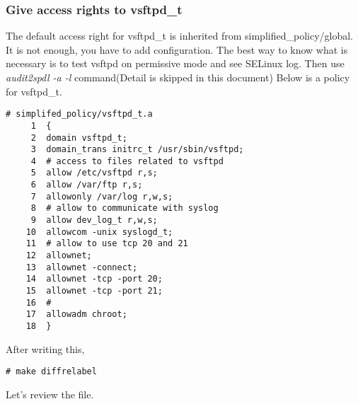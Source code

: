 \subsubsection{Give access rights to vsftpd\_t}
The default access right for vsftpd\_t is inherited from
simplified\_policy/global. It is not enough, you have to add
configuration.  The best way to know what
       is necessary is to test vsftpd on permissive mode and see SELinux
       log. Then use {\it audit2spdl -a -l} command(Detail is skipped in
       this document)
Below is a policy for vsftpd\_t. 
\begin{verbatim}
# simplifed_policy/vsftpd_t.a
     1  {
     2  domain vsftpd_t;
     3  domain_trans initrc_t /usr/sbin/vsftpd;
     4  # access to files related to vsftpd
     5  allow /etc/vsftpd r,s;
     6  allow /var/ftp r,s;
     7  allowonly /var/log r,w,s;
     8  # allow to communicate with syslog
     9  allow dev_log_t r,w,s;
    10  allowcom -unix syslogd_t;
    11  # allow to use tcp 20 and 21
    12  allownet;
    13  allownet -connect;
    14  allownet -tcp -port 20;
    15  allownet -tcp -port 21;
    16  #
    17  allowadm chroot;
    18  }
\end{verbatim}
After writing this, 
\begin{verbatim}
# make diffrelabel
\end{verbatim}
Let's review the file.
